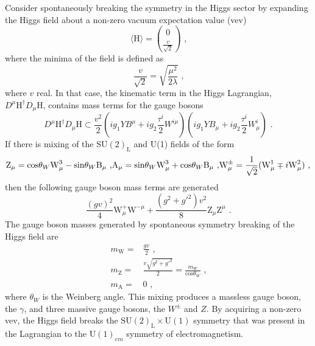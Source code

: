 Consider spontaneously breaking the symmetry in the Higgs sector by expanding the Higgs field about a non-zero vacuum expectation value (vev)
%
\begin{equation}
\langle \text{H} \rangle = \binom{0}{\frac{v}{\sqrt{2}}} \text{ ,}
\label{equ:higgsmin}
\end{equation}
%
\noindent where the minima of the field is defined as
%
\begin{equation}
\frac{v}{\sqrt{2}} = \sqrt{\frac{\mu^{2}}{2\lambda}} \text{ ,}
\end{equation}
%
\noindent where $v$ real.  In that case, the kinematic term in the Higgs Lagrangian, $D^{\mu} \text{H}^{\dagger} D_{\mu} \text{H}$, contains mass terms for the gauge bosons
%
\begin{equation}
D^{\mu} \text{H}^{\dagger} D_{\mu} \text{H} \subset \frac{v^{2}}{2}(ig_{1}YB^{\mu} + ig_{2}\frac{\tau^{i}}{2}W^{i\mu})(ig_{1}YB_{\mu} + ig_{2}\frac{\tau^{i}}{2}W^{i}_{\mu}) \text{ .}
\end{equation}
%
\noindent If there is mixing of the $\text{SU}(2)_{\text{L}}$ and U(1) fields of the form
%
\begin{equation}
\text{Z}_{\mu} = \text{cos}{\theta_{W}} \text{W}^{3}_{\mu} - \text{sin}{\theta_{W}} \text{B}_{\mu} \text{ ,}\\
\text{A}_{\mu} = \text{sin}{\theta_{W}} \text{W}^{3}_{\mu} + \text{cos}{\theta_{W}} \text{B}_{\mu} \text{ ,}\\
\text{W}^{\pm}_{\mu} = \frac{1}{\sqrt{2}}(\text{W}^{1}_{\mu} \mp i \text{W}^{2}_{\mu}) \text{ ,}
\end{equation}
%
\noindent then the following gauge boson mass terms are generated
%
\begin{equation}
\frac{(gv)^{2}}{4} \text{W}^{+}_{\mu} \text{W}^{-\mu} + \frac{(g^{2} + g'^{2})v^{2}}{8} \text{Z}_{\mu} \text{Z}^{\mu} \text{ .}
\end{equation}
%
\noindent The gauge boson masses generated by spontaneous symmetry breaking of the Higgs field are
%
\begin{equation}
\begin{aligned}
m_{\text{W}} = & \frac{gv}{2} \text{ ,} \\
m_{\text{Z}} = & \frac{v\sqrt{g^{2} + g'^{2}}}{2} = \frac{m_{W}}{\text{cos}{\theta_{W}}} \text{ ,} \\
m_{\text{A}} = & 0 \text{ ,}
\end{aligned}
\end{equation}
%
\noindent where $\theta_{W}$ is the Weinberg angle.  This mixing produces a massless gauge boson, the $\gamma$, and three massive gauge bosons, the $W^{\pm}$ and $Z$.  By acquiring a non-zero vev, the Higgs field breaks the $\text{SU}(2)_{\text{L}} \times \text{U}(1)$ symmetry that was present in the Lagrangian to the $\text{U}(1)_{em}$ symmetry of electromagnetism.  

